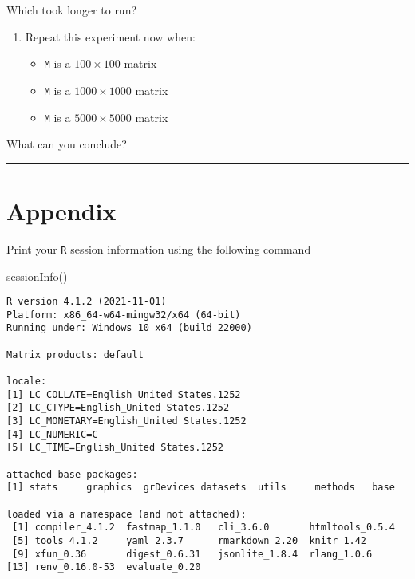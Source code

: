 \documentclass[
  letterpaper,
  DIV=11,
  numbers=noendperiod]{scrartcl}
\newenvironment{Shaded}{\begin{snugshade}}{\end{snugshade}}
\newcommand{\FunctionTok}[1]{\textcolor[rgb]{0.28,0.35,0.67}{#1}}
\newcommand{\NormalTok}[1]{\textcolor[rgb]{0.00,0.23,0.31}{#1}}
\providecommand{\tightlist}{%
  \setlength{\itemsep}{0pt}\setlength{\parskip}{0pt}}\usepackage{longtable,booktabs,array}
\begin{document}
Which took longer to run?

\begin{enumerate}
\def\labelenumi{\arabic{enumi}.}
\setcounter{enumi}{5}
\tightlist
\item
  Repeat this experiment now when:

  \begin{itemize}
  \tightlist
  \item
    \texttt{M} is a \(100 \times 100\) matrix
  \item
    \texttt{M} is a \(1000 \times 1000\) matrix
  \item
    \texttt{M} is a \(5000 \times 5000\) matrix
  \end{itemize}
\end{enumerate}

What can you conclude?

\begin{center}\rule{0.5\linewidth}{0.5pt}\end{center}

\hypertarget{appendix}{%
\section{Appendix}\label{appendix}}

Print your \texttt{R} session information using the following command

\begin{Shaded}
\begin{Highlighting}[]
\FunctionTok{sessionInfo}\NormalTok{()}
\end{Highlighting}
\end{Shaded}

\begin{verbatim}
R version 4.1.2 (2021-11-01)
Platform: x86_64-w64-mingw32/x64 (64-bit)
Running under: Windows 10 x64 (build 22000)

Matrix products: default

locale:
[1] LC_COLLATE=English_United States.1252 
[2] LC_CTYPE=English_United States.1252   
[3] LC_MONETARY=English_United States.1252
[4] LC_NUMERIC=C                          
[5] LC_TIME=English_United States.1252    

attached base packages:
[1] stats     graphics  grDevices datasets  utils     methods   base     

loaded via a namespace (and not attached):
 [1] compiler_4.1.2  fastmap_1.1.0   cli_3.6.0       htmltools_0.5.4
 [5] tools_4.1.2     yaml_2.3.7      rmarkdown_2.20  knitr_1.42     
 [9] xfun_0.36       digest_0.6.31   jsonlite_1.8.4  rlang_1.0.6    
[13] renv_0.16.0-53  evaluate_0.20  
\end{verbatim}
\end{document}
